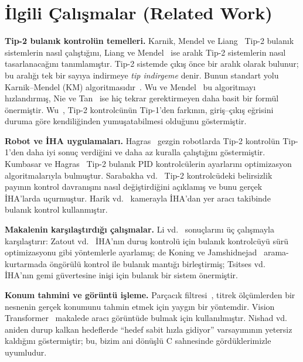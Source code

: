 \documentclass[conference,a4paper]{IEEEtran}
\begin{document}
\section{İlgili Çalışmalar (Related Work)}
\textbf{Tip-2 bulanık kontrolün temelleri.} Karnik, Mendel ve Liang~\cite{karnik1999} Tip-2 bulanık sistemlerin nasıl çalıştığını, Liang ve Mendel~\cite{liang2000} ise aralık Tip-2 sistemlerin nasıl tasarlanacağını tanımlamıştır. Tip-2 sistemde çıkış önce bir aralık olarak bulunur; bu aralığı tek bir sayıya indirmeye \emph{tip indirgeme} denir. Bunun standart yolu Karnik--Mendel (KM) algoritmasıdır~\cite{karnik2001}. Wu ve Mendel~\cite{wu2009} bu algoritmayı hızlandırmış, Nie ve Tan~\cite{nie2008} ise hiç tekrar gerektirmeyen daha basit bir formül önermiştir. Wu~\cite{wu2012}, Tip-2 kontrolcünün Tip-1'den farkının, giriş--çıkış eğrisini duruma göre kendiliğinden yumuşatabilmesi olduğunu göstermiştir.

\textbf{Robot ve İHA uygulamaları.} Hagras~\cite{hagras2004} gezgin robotlarda Tip-2 kontrolün Tip-1'den daha iyi sonuç verdiğini ve daha az kuralla çalıştığını göstermiştir. Kumbasar ve Hagras~\cite{kumbasar2014} Tip-2 bulanık PID kontrolcülerin ayarlarını optimizasyon algoritmalarıyla bulmuştur. Sarabakha vd.~\cite{sarabakha2018} Tip-2 kontrolcüdeki belirsizlik payının kontrol davranışını nasıl değiştirdiğini açıklamış ve bunu gerçek İHA'larda uçurmuştur. Harik vd.~\cite{harik2017} kamerayla İHA'dan yer aracı takibinde bulanık kontrol kullanmıştır.

\textbf{Makalenin karşılaştırdığı çalışmalar.} Li vd.~\cite{li2024} sonuçlarını üç çalışmayla karşılaştırır: Zatout vd.~\cite{zatout2022} İHA'nın duruş kontrolü için bulanık kontrolcüyü sürü optimizasyonu gibi yöntemlerle ayarlamış; de Koning ve Jamshidnejad~\cite{dekoning2023} arama-kurtarmada öngörülü kontrol ile bulanık mantığı birleştirmiş; Tsitses vd.~\cite{tsitses2024} İHA'nın gemi güvertesine inişi için bulanık bir sistem önermiştir.

\textbf{Konum tahmini ve görüntü işleme.} Parçacık filtresi~\cite{gordon1993,arulampalam2002}, titrek ölçümlerden bir nesnenin gerçek konumunu tahmin etmek için yaygın bir yöntemdir. Vision Transformer~\cite{dosovitskiy2021} makalede aracı görüntüde bulmak için kullanılmıştır. Nishad vd.~\cite{nishad2025} aniden durup kalkan hedeflerde ``hedef sabit hızla gidiyor'' varsayımının yetersiz kaldığını göstermiştir; bu, bizim ani dönüşlü C sahnesinde gördüklerimizle uyumludur.
\end{document}
